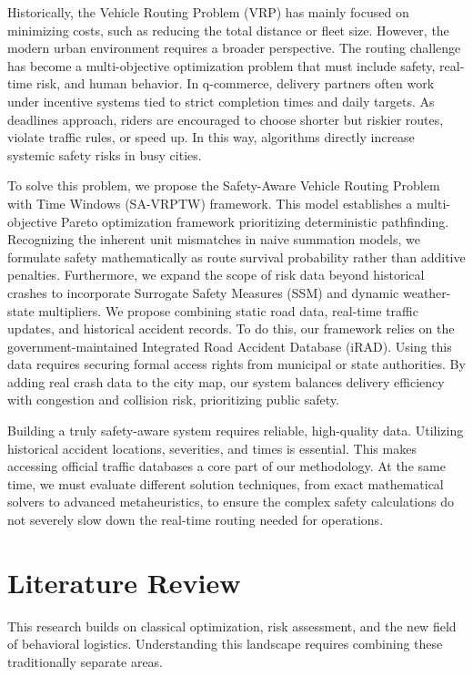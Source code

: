 \documentclass[10pt,twocolumn,letterpaper]{article}
\begin{document}
Historically, the Vehicle Routing Problem (VRP) has mainly focused on minimizing costs, such as reducing the total distance or fleet size. However, the modern urban environment requires a broader perspective. The routing challenge has become a multi-objective optimization problem that must include safety, real-time risk, and human behavior. In q-commerce, delivery partners often work under incentive systems tied to strict completion times and daily targets. As deadlines approach, riders are encouraged to choose shorter but riskier routes, violate traffic rules, or speed up. In this way, algorithms directly increase systemic safety risks in busy cities.

To solve this problem, we propose the Safety-Aware Vehicle Routing Problem with Time Windows (SA-VRPTW) framework. This model establishes a multi-objective Pareto optimization framework prioritizing deterministic pathfinding. Recognizing the inherent unit mismatches in naive summation models, we formulate safety mathematically as route survival probability rather than additive penalties. Furthermore, we expand the scope of risk data beyond historical crashes to incorporate Surrogate Safety Measures (SSM) and dynamic weather-state multipliers. We propose combining static road data, real-time traffic updates, and historical accident records. To do this, our framework relies on the government-maintained Integrated Road Accident Database (iRAD). Using this data requires securing formal access rights from municipal or state authorities. By adding real crash data to the city map, our system balances delivery efficiency with congestion and collision risk, prioritizing public safety.

Building a truly safety-aware system requires reliable, high-quality data. Utilizing historical accident locations, severities, and times is essential. This makes accessing official traffic databases a core part of our methodology. At the same time, we must evaluate different solution techniques, from exact mathematical solvers to advanced metaheuristics, to ensure the complex safety calculations do not severely slow down the real-time routing needed for operations.

\section{Literature Review}

This research builds on classical optimization, risk assessment, and the new field of behavioral logistics. Understanding this landscape requires combining these traditionally separate areas.
\end{document}
